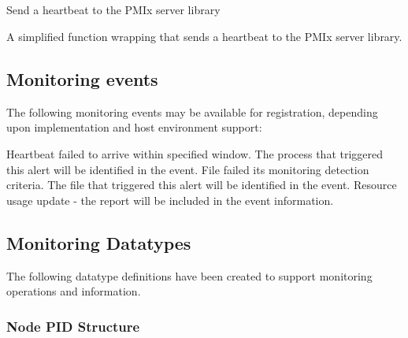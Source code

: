 \subsection{}

\summary

Send a heartbeat to the \ac{PMIx} server library

\format



\descr

A simplified function wrapping  that sends a heartbeat to the \ac{PMIx} server library.

\subsection{Monitoring events}
\label{api:struct:events:monitor}

The following monitoring events may be available for registration, depending upon implementation and host environment support:

\begin{constantdesc}
%
Heartbeat failed to arrive within specified window. The process that triggered this alert will be identified in the event.
%
File failed its monitoring detection criteria. The file that triggered this alert will be identified in the event.
%
Resource usage update - the report will be included in the event information.
%
\end{constantdesc}

\subsection{Monitoring Datatypes}

The following datatype definitions have been created to support monitoring operations and information.

\subsubsection{Node PID Structure}

